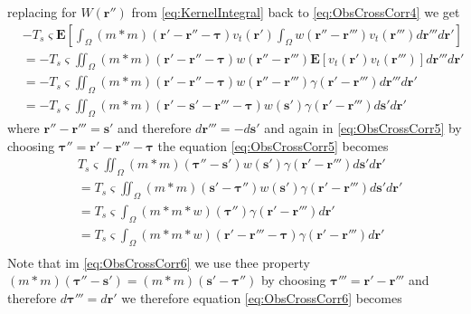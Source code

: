 \documentclass[]{article}
\begin{document}
replacing for $W(\mathbf r'')$ from \eqref{eq:KernelIntegral}  back to \eqref{eq:ObsCrossCorr4} we get
\begin{align}
 &-T_s \varsigma\mathbf E \left[\int_{\Omega} (m \ast m)\left(\mathbf r'-\mathbf r''-\boldsymbol \tau\right)v_t\left(\mathbf r'\right)  \int_{\Omega}w\left(\mathbf r''-\mathbf r'''\right)v_t\left(\mathbf r'''\right)d\mathbf r''' d\mathbf r'\right]\nonumber\\
&=-T_s \varsigma\iint_{\Omega} (m \ast m)\left(\mathbf r'-\mathbf r''-\boldsymbol \tau\right)w\left(\mathbf r''-\mathbf r'''\right)\mathbf E \left[v_t\left(\mathbf r'\right)  v_t\left(\mathbf r'''\right)\right]d\mathbf r''' d\mathbf r' \nonumber \\
&=-T_s \varsigma\iint_{\Omega} (m \ast m)\left(\mathbf r'-\mathbf r''-\boldsymbol \tau\right)w\left(\mathbf r''-\mathbf r'''\right)\gamma(\mathbf r'-\mathbf r''')d\mathbf r''' d\mathbf r'\nonumber \\
&=-T_s \varsigma\iint_{\Omega} (m \ast m)\left(\mathbf r'-\mathbf s'-\mathbf r'''-\boldsymbol \tau\right)w\left(\mathbf s'\right)\gamma(\mathbf r'-\mathbf r''')d\mathbf s'd\mathbf r'\label{eq:ObsCrossCorr5}
\end{align}
where $\mathbf r'' -\mathbf r'''=\mathbf s' $ and therefore $d \mathbf r'''=-d\mathbf s' $ and again in \eqref{eq:ObsCrossCorr5} by choosing $\boldsymbol\tau''=\mathbf r' -\mathbf r'''-\boldsymbol\tau$ the equation \eqref{eq:ObsCrossCorr5} becomes
\begin{align}
&T_s \varsigma\iint_{\Omega} (m \ast m)\left(\boldsymbol \tau''-\mathbf s'\right)w\left(\mathbf s'\right)\gamma(\mathbf r'-\mathbf r''')d\mathbf s'd\mathbf r' \nonumber \\
&=T_s \varsigma\iint_{\Omega} (m \ast m)\left(\mathbf s'-\boldsymbol \tau''\right)w\left(\mathbf s'\right)\gamma(\mathbf r'-\mathbf r''')d\mathbf s'd\mathbf r' \nonumber \\
&=T_s \varsigma\int_{\Omega} (m \ast m \ast w)\left(\boldsymbol \tau''\right)\gamma(\mathbf r'-\mathbf r''')d\mathbf r' \nonumber \\
&=T_s \varsigma\int_{\Omega} (m \ast m \ast w)\left(\mathbf r' -\mathbf r'''-\boldsymbol\tau\right)\gamma(\mathbf r'-\mathbf r''')d\mathbf r' \nonumber \\
\label{eq:ObsCrossCorr6}
\end{align}
Note that im \eqref{eq:ObsCrossCorr6} we use thee property $(m \ast m)\left(\boldsymbol \tau''-\mathbf s'\right)= (m \ast m)\left(\mathbf s'-\boldsymbol \tau''\right)$ by choosing $\boldsymbol\tau'''=\mathbf r'-\mathbf r'''$ and therefore $d\boldsymbol \tau'''=d\mathbf r'$ we therefore equation \ref{eq:ObsCrossCorr6} becomes
\end{document}

